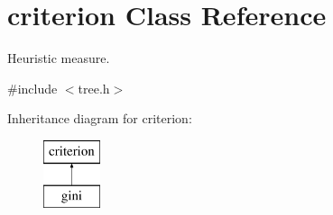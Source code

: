 \hypertarget{classcriterion}{\section{criterion Class Reference}
\label{classcriterion}
}


Heuristic measure.  




{\ttfamily \#include $<$tree.\+h$>$}

Inheritance diagram for criterion\+:\begin{figure}[H]
\begin{center}
\leavevmode
\includegraphics[height=2.000000cm]{classcriterion}
\end{center}
\end{figure}
